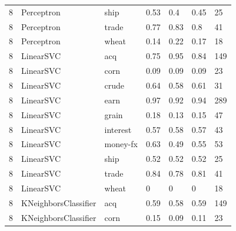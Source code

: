 \documentclass{article}
\begin{document}
\begin{table}[h]
\begin{tabular}{lllllll}
8             & Perceptron             & ship            & 0.53               & 0.4             & 0.45              & 25               \\
8             & Perceptron             & trade           & 0.77               & 0.83            & 0.8               & 41               \\
8             & Perceptron             & wheat           & 0.14               & 0.22            & 0.17              & 18               \\
8             & LinearSVC              & acq             & 0.75               & 0.95            & 0.84              & 149              \\
8             & LinearSVC              & corn            & 0.09               & 0.09            & 0.09              & 23               \\
8             & LinearSVC              & crude           & 0.64               & 0.58            & 0.61              & 31               \\
8             & LinearSVC              & earn            & 0.97               & 0.92            & 0.94              & 289              \\
8             & LinearSVC              & grain           & 0.18               & 0.13            & 0.15              & 47               \\
8             & LinearSVC              & interest        & 0.57               & 0.58            & 0.57              & 43               \\
8             & LinearSVC              & money-fx        & 0.63               & 0.49            & 0.55              & 53               \\
8             & LinearSVC              & ship            & 0.52               & 0.52            & 0.52              & 25               \\
8             & LinearSVC              & trade           & 0.84               & 0.78            & 0.81              & 41               \\
8             & LinearSVC              & wheat           & 0                  & 0               & 0                 & 18               \\
8             & KNeighborsClassifier   & acq             & 0.59               & 0.58            & 0.59              & 149              \\
8             & KNeighborsClassifier   & corn            & 0.15               & 0.09            & 0.11              & 23               \\

\end{tabular}
\end{table}
\end{document}
